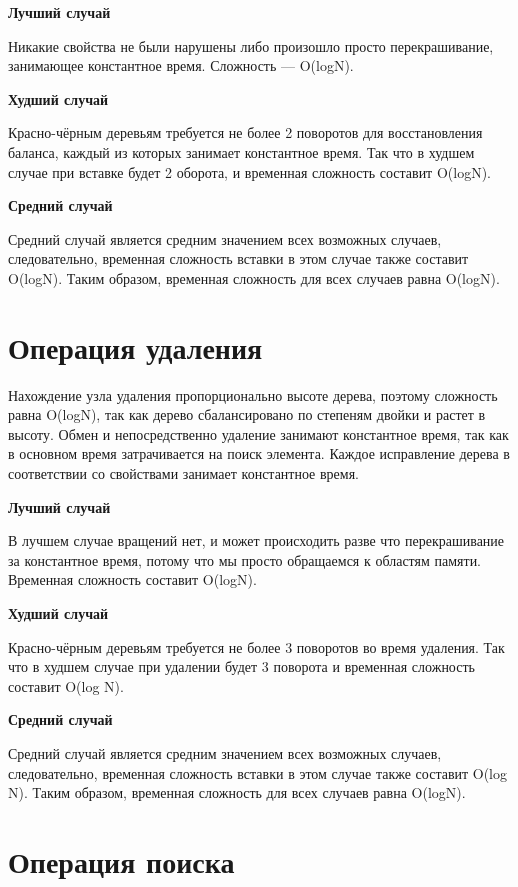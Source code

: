 \documentclass[bachelor, och, referat, times]{SCWorks}
\begin{document}
\vspace{5mm}

\textbf{Лучший случай}

Никакие свойства не были нарушены либо произошло просто перекрашивание, 
занимающее константное время. Сложность — O(logN).

\textbf{Худший случай}

Красно-чёрным деревьям требуется не более 2 поворотов для восстановления баланса, 
каждый из которых занимает константное время. Так что в худшем случае при вставке будет 2 оборота, 
и временная сложность составит O(logN).

\textbf{Средний случай}

Средний случай является средним значением всех возможных случаев, следовательно, временная сложность вставки в этом случае также составит O(logN).
Таким образом, временная сложность для всех случаев равна O(logN).

\section{Операция удаления}

Нахождение узла удаления пропорционально высоте дерева, поэтому сложность равна O(logN),
 так как дерево сбалансировано по степеням двойки и растет в высоту. 
 Обмен и непосредственно удаление занимают константное время, 
 так как в основном время затрачивается на поиск элемента. 
 Каждое исправление дерева в соответствии со свойствами занимает константное время.

\textbf{Лучший случай}

В лучшем случае вращений нет, и может происходить разве что перекрашивание за константное время, 
потому что мы просто обращаемся к областям памяти. Временная сложность составит O(logN).


\textbf{Худший случай}

Красно-чёрным деревьям требуется не более 3 поворотов во время удаления. 
Так что в худшем случае при удалении будет 3 поворота и временная сложность составит O(log N).


\textbf{Средний случай}

Средний случай является средним значением всех возможных случаев, следовательно,
 временная сложность вставки в этом случае также составит O(log N).
Таким образом, временная сложность для всех случаев равна O(logN).

\section{Операция поиска}
\end{document}

